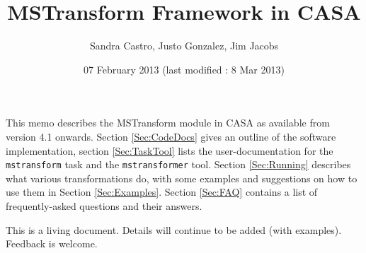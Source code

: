 \documentclass[11pt]{article}
\begin{document}
\title{MSTransform Framework in CASA}
\author{Sandra Castro, Justo Gonzalez, Jim Jacobs}
\date{07 February 2013 (last modified : 8 Mar 2013)}
\maketitle

This memo describes the MSTransform module in CASA as available from version 4.1 onwards. 
Section \ref{Sec:CodeDocs} gives an outline of the software implementation, section 
\ref{Sec:TaskTool} lists the user-documentation for the {\tt mstransform} task and the 
{\tt mstransformer} tool.  Section \ref{Sec:Running} describes what 
various transformations do, with some examples and suggestions on how to use them in
Section \ref{Sec:Examples}. 
Section \ref{Sec:FAQ} contains a list of frequently-asked questions and their answers.

This is a living document. Details will continue to be added (with examples). Feedback is welcome.

\tableofcontents

%


\end{document}
